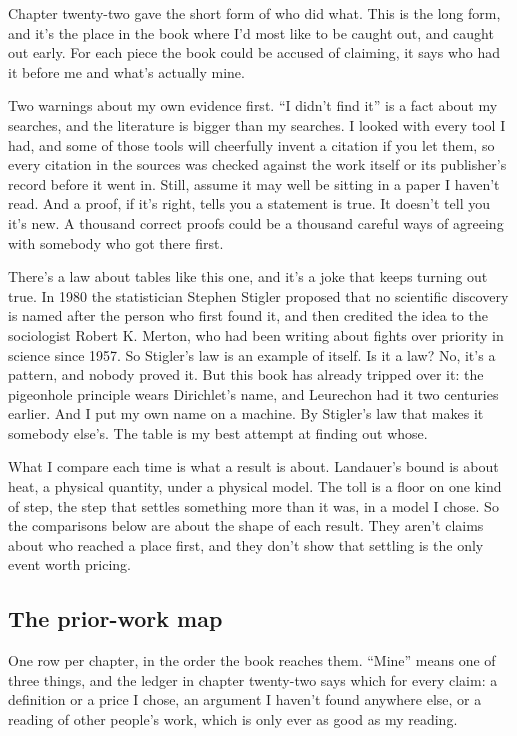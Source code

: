 \documentclass[11pt,twoside]{article}
\theoremstyle{thielethm}
\theoremstyle{thieledef}
\theoremstyle{thieledef}
\theoremstyle{thieledef}
\theoremstyle{thielethm}
\theoremstyle{thieleobs}
\theoremstyle{thielethm}
\begin{document}
Chapter twenty-two gave the short form of who did what. This is the long form, and it's the place in the book where I'd most like to be caught out, and caught out early. For each piece the book could be accused of claiming, it says who had it before me and what's actually mine.

Two warnings about my own evidence first. ``I didn't find it'' is a fact about my searches, and the literature is bigger than my searches. I looked with every tool I had, and some of those tools will cheerfully invent a citation if you let them, so every citation in the sources was checked against the work itself or its publisher's record before it went in. Still, assume it may well be sitting in a paper I haven't read. And a proof, if it's right, tells you a statement is true. It doesn't tell you it's new. A thousand correct proofs could be a thousand careful ways of agreeing with somebody who got there first.

There's a law about tables like this one, and it's a joke that keeps turning out true. In 1980 the statistician Stephen Stigler proposed that no scientific discovery is named after the person who first found it, and then credited the idea to the sociologist Robert K. Merton, who had been writing about fights over priority in science since 1957. So Stigler's law is an example of itself. Is it a law? No, it's a pattern, and nobody proved it. But this book has already tripped over it: the pigeonhole principle wears Dirichlet's name, and Leurechon had it two centuries earlier. And I put my own name on a machine. By Stigler's law that makes it somebody else's. The table is my best attempt at finding out whose.

What I compare each time is what a result is about. Landauer's bound is about heat, a physical quantity, under a physical model. The toll is a floor on one kind of step, the step that settles something more than it was, in a model I chose. So the comparisons below are about the shape of each result. They aren't claims about who reached a place first, and they don't show that settling is the only event worth pricing.

\subsection{The prior-work map}

One row per chapter, in the order the book reaches them. ``Mine'' means one of three things, and the ledger in chapter twenty-two says which for every claim: a definition or a price I chose, an argument I haven't found anywhere else, or a reading of other people's work, which is only ever as good as my reading.
\end{document}
